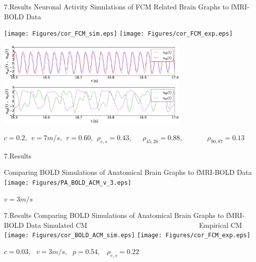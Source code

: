 \documentclass{beamer}
\begin{document}
\begin{frame}{7.Results}
\footnotesize{Neuronal Activity Simulations of FCM Related Brain Graphs to fMRI-BOLD Data}

\break

	\centering
	 \texttt{[image: Figures/cor\_FCM\_sim.eps]} 
   	 \texttt{[image: Figures/cor\_FCM\_exp.eps]} 

 \includegraphics[width=0.7\textwidth]{Figures/cor_FCM_sim_no_best.eps} \\
 \includegraphics[width=0.7\textwidth]{Figures/cor_FCM_sim_no_worst.eps} 

\tiny{$c=0.2,~~ v=7 m/s, ~~ r=0.60, ~~ \rho_{e,s}=0.43$, ~~ $\rho_{45,28}=0.88$, ~~~~~~ $\rho_{90,87}=0.13$}

\end{frame}


\begin{frame}{7.Results}

\footnotesize{Comparing BOLD Simulations of Anatomical Brain Graphs to fMRI-BOLD Data} 
\break
	\centering
    \texttt{[image: Figures/PA\_BOLD\_ACM\_v\_3.eps]} 
    
 $v=3 m/s$   
    
\end{frame}



\begin{frame}{7.Results}
\footnotesize{Comparing BOLD Simulations of Anatomical Brain Graphs to fMRI-BOLD Data} 
\break
	\centering
	\break
	\footnotesize{Simulated CM ~~~~~~~~~~~~~~~~~~~~~~~~~~~~~~~ Empirical CM }
	 \texttt{[image: Figures/cor\_BOLD\_ACM\_sim.eps]} 
   	 \texttt{[image: Figures/cor\_FCM\_exp.eps]} 

$c=0.03, ~~~ v=3 m/s, ~~~ p=0.54, ~~~~ \rho_{e,s}=0.22$

\end{frame}
\end{document}
